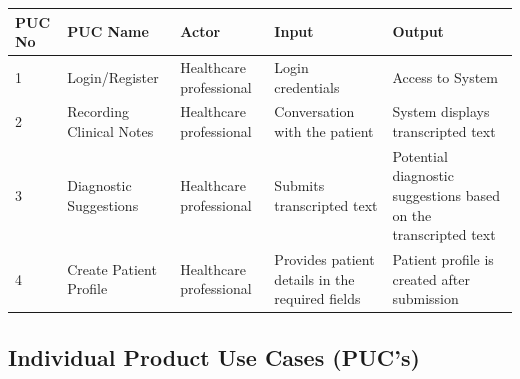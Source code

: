 \documentclass[12pt]{article}
\begin{document}
\begin{tabular}{ | p{3cm} | p{3cm} | p{3cm} | p{3cm} | p{3cm} | }
  \hline
  \textbf{PUC No} & \textbf{PUC Name} & \textbf{Actor} & \textbf{Input} & \textbf{Output}  \\ \hline
  1 & Login/Register & Healthcare professional & Login credentials & Access to System \\ \hline
  2 & Recording Clinical Notes & Healthcare professional & Conversation with the patient & System displays transcripted text \\ \hline
  3 & Diagnostic Suggestions & Healthcare professional & Submits transcripted text & Potential diagnostic suggestions based on the transcripted text \\ \hline
  4 & Create Patient Profile & Healthcare professional & Provides patient details in the required fields & Patient profile is created after submission \\ \hline 
\end{tabular}

\subsection{Individual Product Use Cases (PUC's)}
\end{document}
